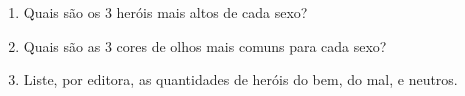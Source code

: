 \documentclass[
  11pt]{report}
\begin{document}
\begin{enumerate}

\item
  Quais são os $3$ heróis mais altos de cada sexo?

\item
  Quais são as $3$ cores de olhos mais comuns para cada sexo?

\item
  Liste, por editora, as quantidades de heróis do bem, do mal, e neutros.


\end{enumerate}
\end{document}
